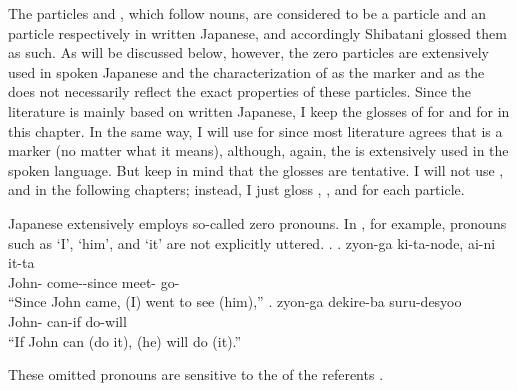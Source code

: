 The particles  and , which follow nouns, are considered to be a  particle and an  particle respectively in written Japanese,
and accordingly Shibatani glossed them as such.
As will be discussed below, however,
the zero particles are extensively used in spoken Japanese and
the characterization of  as the  marker and  as the  does not necessarily reflect the exact properties of these particles.
Since the literature is mainly based on written Japanese,
I keep the glosses of  for  and  for  in this chapter.
In the same way, I will use  for  since
most literature agrees that  is a  marker (no matter what it means),
although, again, the  is extensively used in the spoken language.
But keep in mind that the glosses are tentative.
I will not use  , and  in the following chapters;
instead, I just gloss , , and  for each particle.

Japanese extensively employs so-called zero pronouns.
In \Next, for example,
pronouns such as `I', `him', and `it' are not explicitly uttered.
%
\ex.
 \ag. zyon-ga ki-ta-node, ai-ni it-ta \\
      John- come--since meet- go- \\
      ``Since John came, (I) went to see (him),''
 \bg. zyon-ga dekire-ba suru-desyoo \\
      John- can-if do-will \\
      ``If John can (do it), (he) will do (it).''
      \hfill{\cite[17]{kuno73}}

These omitted pronouns are sensitive to the  of the referents \cite[see][Chapter 1]{kuno78}.


